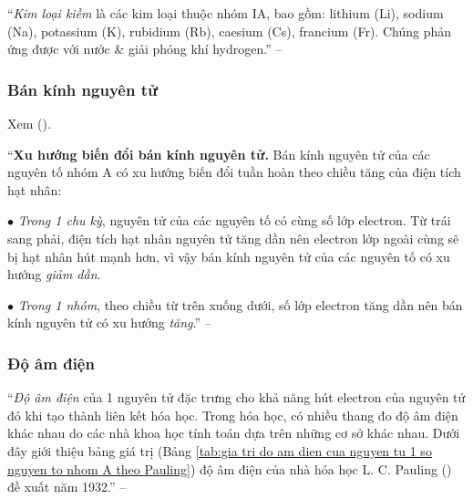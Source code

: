 \documentclass{article}
\numberwithin{equation}{section}
\begin{document}
``\textit{Kim loại kiềm} là các kim loại thuộc nhóm IA, bao gồm: lithium (Li), sodium (Na), potassium (K), rubidium (Rb), caesium (Cs), francium (Fr). Chúng phản ứng được với nước \& giải phóng khí hydrogen.'' -- \cite[p. 43]{SGK_Hoa_Hoc_10_Chan_Troi_Sang_Tao}

\subsubsection{Bán kính nguyên tử}
Xem \cite[Hình 6.1: \textsf{Bán kính nguyên tử của 1 số nguyên tố được biểu diễn bằng pm ($\rm 1\ pm = 10^{-12}\ m$)}]{SGK_Hoa_Hoc_10_Chan_Troi_Sang_Tao} (\cite{Buthelezi_Dingrando_Hainen_Wistrom_Zike2013}).

``\textbf{Xu hướng biến đổi bán kính nguyên tử.} Bán kính nguyên tử của các nguyên tố nhóm A có xu hướng biến đổi tuần hoàn theo chiều tăng của điện tích hạt nhân:
\begin{enumerate*}
	\item[$\bullet$] \textit{Trong 1 chu kỳ}, nguyên tử của các nguyên tố có cùng số lớp electron. Từ trái sang phải, điện tích hạt nhân nguyên tử tăng dần nên electron lớp ngoài cùng sẽ bị hạt nhân hút mạnh hơn, vì vậy bán kính nguyên tử của các nguyên tố có xu hướng \textit{giảm dần}.
	\item[$\bullet$] \textit{Trong 1 nhóm}, theo chiều từ trên xuống dưới, số lớp electron tăng dần nên bán kính nguyên tử có xu hướng \textit{tăng}.'' -- \cite[p. 44]{SGK_Hoa_Hoc_10_Chan_Troi_Sang_Tao}
\end{enumerate*}

\subsubsection{Độ âm điện}
``\textit{Độ âm điện} của 1 nguyên tử đặc trưng cho khả năng hút electron của nguyên tử đó khi tạo thành liên kết hóa học. Trong hóa học, có nhiều thang đo độ âm điện khác nhau do các nhà khoa học tính toán dựa trên những cơ sở khác nhau. Dưới đây giới thiệu bảng giá trị (Bảng \ref{tab:gia tri do am dien cua nguyen tu 1 so nguyen to nhom A theo Pauling}) độ âm điện của nhà hóa học L. C. Pauling (\cite{Buthelezi_Dingrando_Hainen_Wistrom_Zike2013}) đề xuất năm 1932.'' -- \cite[p. 44]{SGK_Hoa_Hoc_10_Chan_Troi_Sang_Tao}
\end{document}
